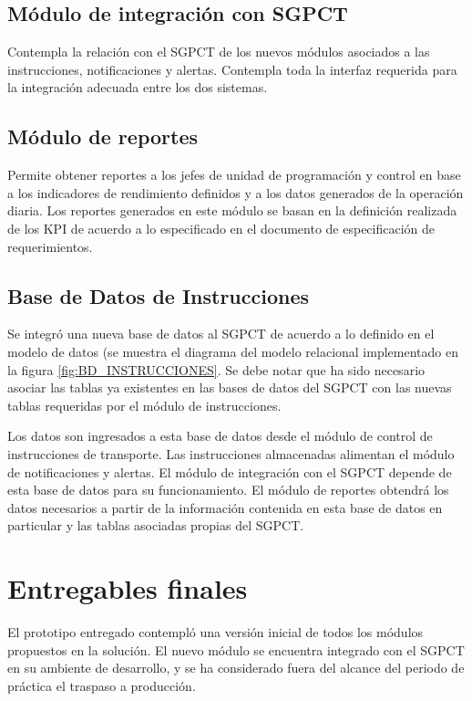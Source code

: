 \documentclass[oneside,12pt, letterpaper, titlepage]{book}
\begin{document}
\subsection{Módulo de integración con SGPCT}
Contempla la relación con el SGPCT de los nuevos módulos asociados a las instrucciones, notificaciones y alertas. Contempla toda la interfaz requerida para la integración adecuada entre los dos sistemas.

\subsection{Módulo de reportes}
Permite obtener reportes a los jefes de unidad de programación y control en base a los indicadores de rendimiento definidos y a los datos generados de la operación diaria. Los reportes generados en este módulo se basan en la definición realizada de los KPI de acuerdo a lo especificado en el documento de especificación de requerimientos.

\subsection{Base de Datos de Instrucciones}
Se integró una nueva base de datos al SGPCT de acuerdo a lo definido en el modelo de datos (se muestra el diagrama del modelo relacional implementado en la figura \ref{fig:BD_INSTRUCCIONES}. Se debe notar que ha sido necesario asociar las tablas ya existentes en las bases de datos del SGPCT con las nuevas tablas requeridas por el módulo de instrucciones. 

Los datos son ingresados a esta base de datos desde el módulo de control de instrucciones de transporte. Las instrucciones almacenadas alimentan el módulo de notificaciones y alertas. El módulo de integración con el SGPCT depende de esta base de datos para su funcionamiento. El módulo de reportes obtendrá los datos necesarios a partir de la información contenida en esta base de datos en particular y las tablas asociadas propias del SGPCT.

\section{Entregables finales}
El prototipo entregado contempló una versión inicial de todos los módulos propuestos en la solución. El nuevo módulo se encuentra integrado con el SGPCT en su ambiente de desarrollo, y se ha considerado fuera del alcance del periodo de práctica el traspaso a producción.
\end{document}
